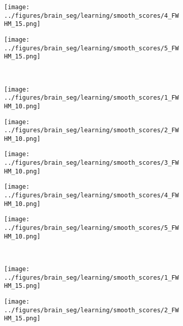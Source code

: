 \begin{figure}[h!]
\begin{subfigure}{0.16\textwidth}
		\label{fig:8}
	\end{subfigure}
	\begin{subfigure}{0.16\textwidth}
		\centering
		\texttt{[image: ../figures/brain\_seg/learning/smooth\_scores/4\_FWHM\_15.png]}
		\label{fig:9}
	\end{subfigure}
	\begin{subfigure}{0.16\textwidth}
		\centering
		\texttt{[image: ../figures/brain\_seg/learning/smooth\_scores/5\_FWHM\_15.png]}
		\label{fig:10}
	\end{subfigure}
	\\
	\vspace{-0.35cm}
	\begin{subfigure}{0.16\textwidth}
		\centering
		\texttt{[image: ../figures/brain\_seg/learning/smooth\_scores/1\_FWHM\_10.png]}
		\label{fig:6}
	\end{subfigure}
	\begin{subfigure}{0.16\textwidth}
		\centering
		\texttt{[image: ../figures/brain\_seg/learning/smooth\_scores/2\_FWHM\_10.png]}
		\label{fig:7}
	\end{subfigure}
	\begin{subfigure}{0.16\textwidth}
		\centering
		\texttt{[image: ../figures/brain\_seg/learning/smooth\_scores/3\_FWHM\_10.png]}
		\label{fig:8}
	\end{subfigure}
	\begin{subfigure}{0.16\textwidth}
		\centering
		\texttt{[image: ../figures/brain\_seg/learning/smooth\_scores/4\_FWHM\_10.png]}
		\label{fig:9}
	\end{subfigure}
	\begin{subfigure}{0.16\textwidth}
		\centering
		\texttt{[image: ../figures/brain\_seg/learning/smooth\_scores/5\_FWHM\_10.png]}
		\label{fig:10}
	\end{subfigure}
		\\
	\vspace{-0.35cm}
	\begin{subfigure}{0.16\textwidth}
		\centering
		\texttt{[image: ../figures/brain\_seg/learning/smooth\_scores/1\_FWHM\_15.png]}
		\label{fig:6}
	\end{subfigure}
	\begin{subfigure}{0.16\textwidth}
		\centering
		\texttt{[image: ../figures/brain\_seg/learning/smooth\_scores/2\_FWHM\_15.png]}
		\label{fig:7}
	\end{subfigure}

\end{figure}
